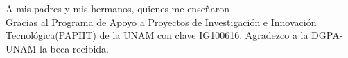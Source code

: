 \begin{dedication}
A mis padres y mis hermanos, quienes me enseñaron \\


Gracias al Programa de Apoyo a Proyectos de Investigación e Innovación Tecnológica(PAPIIT) de la UNAM con clave IG100616. Agradezco a la DGPA-UNAM la beca recibida.
\end{dedication}
